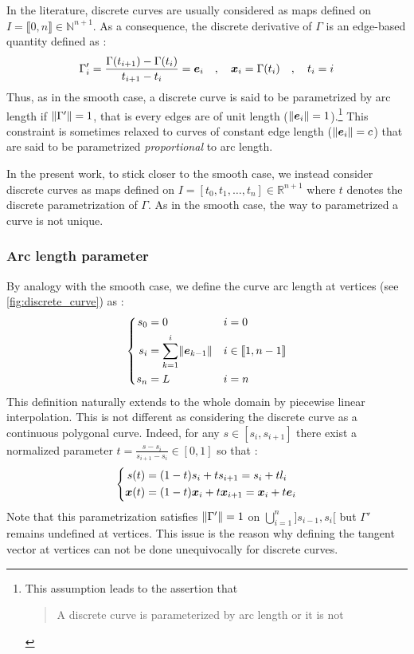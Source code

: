 In the literature, discrete curves are usually considered as maps defined on $I = \llbracket 0,n \rrbracket \in \mathbb{N}^{n+1}$. As a consequence, the discrete derivative of $\Gamma$ is an edge-based quantity defined as : 
\begin{equation}
	\Gamma'_i = \frac{ \Gamma(t_{i+1}) -  \Gamma(t_i)}{t_{i+1} - t_i} = \boldsymbol{e}_i 
	\quad , \quad
	\boldsymbol{x}_{i} = \Gamma(t_i)
	\quad , \quad
	t_i = i
\end{equation}
Thus, as in the smooth case, a discrete curve is said to be parametrized by arc length if $\lVert\Gamma'\rVert = 1$, that is every edges are of unit length ($\lVert\boldsymbol{e}_i\rVert = 1$).\footnote{This assumption leads to the assertion that \blockcquote[p.10]{Hoffmann2008}{A discrete curve is parameterized by arc length or it is not}.} This constraint is sometimes relaxed to curves of constant edge length ($\lVert\boldsymbol{e}_i\rVert = c$) that are said to be parametrized \emph{proportional} to arc length.

In the present work, to stick closer to the smooth case, we instead consider discrete curves as maps defined on $I = [t_0, t_1, \ldots, t_n] \in \mathbb{R}^{n+1}$ where $t$ denotes the discrete parametrization of $\Gamma$. As in the smooth case, the way to parametrized a curve is not unique.

\subsubsection{Arc length parameter}
By analogy with the smooth case, we define the curve arc length at vertices (see \cref{fig:discrete_curve}) as :
\begin{equation}
	\left\{
	\begin{aligned}
		s_0 	&= 0 								& 	&i = 0		\\
		s_i 	&= \sum_{k=1}^i \lVert\boldsymbol{e}_{k-1}\rVert		&	&i \in \llbracket 1, n-1 \rrbracket	\\
		s_n 	&=  L 								&	&i = n		\\
	\end{aligned}
	\right.
\end{equation}
This definition naturally extends to the whole domain by piecewise linear interpolation. This is not different as considering the discrete curve as a continuous polygonal curve. Indeed, for any $s \in [s_i, s_{i+1}]$ there exist a normalized parameter $t = \frac{s - s_i}{s_{i+1} - s_i} \in [0,1]$ so that :
\begin{equation}
	\left\{
	\begin{aligned}
		s(t) &= (1-t) s_i + t s_{i+1} = s_i + t l_i \\
		\boldsymbol{x}(t) &= (1-t) \boldsymbol{x}_i  + t \boldsymbol{x}_{i+1} =  \boldsymbol{x}_i + t  \boldsymbol{e}_i 
	\end{aligned}
	\right.
\end{equation}
Note that this parametrization satisfies $\lVert\Gamma'\rVert=1$ on $\bigcup_{i=1}^n ]s_{i-1}, s_i[$ but $\Gamma'$ remains undefined at vertices. This issue is the reason why defining the tangent vector at vertices can not be done unequivocally for discrete curves.


